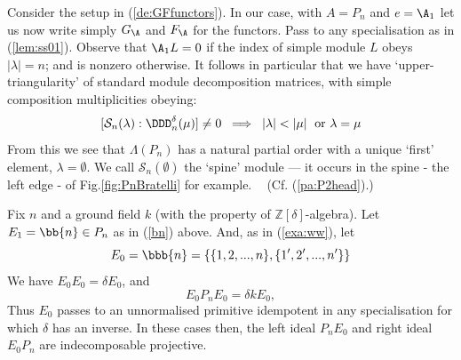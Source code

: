 \documentclass[reqno,10pt,a4paper]{amsart}
\newcommand{\Z}{\mathbb{Z}}
\newcommand{\beq}{\begin{equation}}
\newcommand{\eq}{\end{equation}}
\newcommand{\blue}[1]{\textcolor{blue}{#1}}
\newcommand{\red}[1]{\textcolor{red}{#1}}
\newcommand{\ppm}[1]{\red{#1}}
\newcommand{\ppmx}[1]{}
\newcommand{\ca}[1]{\blue{#1}}
\newcommand{\cell}{\mathcal{S}}
\newcommand{\SSS}{\mathcal{S}} %
\newcommand{\rmP}{{\mathtt P}} %
\newcommand{\confer}[1]{$\;$(Cf. (#1).)}  %
\begin{document}
\mdef  \label{de:GA}
Consider the setup in (\ref{de:GFfunctors}). 
In our case, with $A=P_n$ and $e= \A_1$ let us 
now write simply $G_\A$ and $F_\A$ for the functors. 
Pass to any specialisation as in (\ref{lem:ss01}).
Observe that $\A_1 L=0$ if the index of 
simple module 
$L$ obeys $|\lambda| =n$; and is nonzero otherwise.
It follows in particular that 
we have `upper-triangularity'
of standard module decomposition matrices, 
with simple composition multiplicities obeying:
\begin{equation}
      \label{eq:uppertriangular}
[\SSS_n(\lambda) : \DDD_n^{\delta}(\mu)] \neq 0 
\;\implies\; 
|\lambda| < |\mu |  \; \mbox{ or } \lambda=\mu
\end{equation}
%
%
{From this we see that $\Lambda(P_n)$ has a 
natural partial order with a 
unique `first' element, $\lambda=\emptyset$. We call $\SSS_n(\emptyset)$ the `spine' module 
--- it occurs in the spine 
- the left edge -
of Fig.\ref{fig:PnBratelli} 
for example.}
$\;$
\confer{\ref{pa:P2head}}






\newcommand{\E}{E}

\medskip 
\mdef   \label{de:Pn-spine} 
Fix $n$  and a ground field $k$ (with the property of $\Z[\delta]$-algebra).
Let $\E_1 =\bb{n} \in P_n$  %
as in (\ref{bn}) above. 
And, as in (\ref{exa:ww}), let %
\beq   \label{eq:E0} 
\E_0 = \bbb{n}  = \{ \{1,2,...,n\},\{1',2',...,n'\}\}
\eq 
We  have $\E_0 \E_0 = \delta \E_0$, 
and 
\beq \label{eq:EPE} 
\E_0 P_n \E_0 = \delta k \E_0 ,
\eq 
Thus $\E_0$ passes to an unnormalised primitive idempotent in any specialisation for which $\delta$ has an inverse.
In these cases then, the left ideal $P_n \E_0$ and right ideal $\E_0 P_n$ are  indecomposable projective. 
\end{document}
